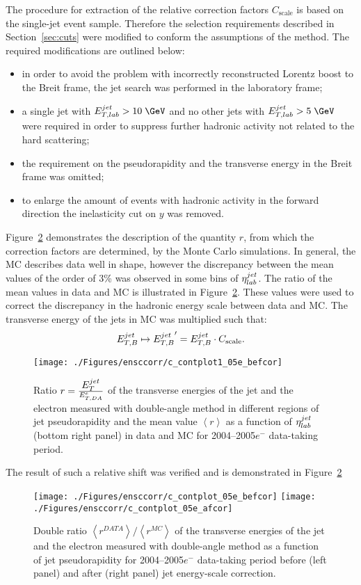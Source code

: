 The procedure for extraction of the relative correction factors $C_\text{scale}$ is based on the single-jet event sample. Therefore the selection requirements described in Section~\ref{sec:cuts} were modified to conform the assumptions of the method. The required modifications are outlined below: 
\begin{itemize}
	\item in order to avoid the problem with incorrectly reconstructed Lorentz boost to the Breit frame, the jet search was performed in the laboratory frame;
	\item a single jet with $\etjetlab > 10\; \GeV$ and no other jets with $\etjetlab > 5\; \GeV$ were required in order to suppress further hadronic activity not related to the hard scattering;
	\item the requirement on the pseudorapidity and the transverse energy in the Breit frame was omitted;
	\item to enlarge the amount of events with hadronic activity in the forward direction the inelasticity cut on $y$ was removed.
\end{itemize}

Figure~\ref{fig:ratcalibcontrolplot} demonstrates the description of the quantity $r$, from which the correction factors are determined, by the Monte Carlo simulations. In general, the MC describes data well in shape, however the discrepancy between the mean values of the order of 3\% was observed in some bins of $\mbox{$\eta^{jet}_{lab}$}$. The ratio of the mean values in data and MC is illustrated in Figure~\ref*{fig:ratcalibcontrolplot}. These values were used to correct the discrepancy in the hadronic energy scale between data and MC. The transverse energy of the jets in MC was multiplied such that:
\begin{equation}
 \mbox{$E_{T,B}^{jet}$} \mapsto \mbox{$E_{T,B}^{jet}$}' = \mbox{$E_{T,B}^{jet}$} \cdot C_\text{scale}.
\end{equation}
\begin{figure}[htbp]
	\centering
		\texttt{[image: ./Figures/ensccorr/c\_contplot1\_05e\_befcor]} 
	\caption{Ratio $r=\frac{\mbox{$E_T^{jet}$}}{E_{T,DA}^e}$ of the transverse energies of the jet and the electron measured with double-angle method in different regions of jet pseudorapidity and the mean value $\left\langle r\right\rangle$ as a function of $\mbox{$\eta^{jet}_{lab}$}$ (bottom right panel) in data and MC for 2004--2005$e^-$ data-taking period.}
	\label{fig:ratcalibcontrolplot}
\end{figure}
The result of such a relative shift was verified and is demonstrated in Figure~\ref*{fig:ratcalibcontrolplot}
\begin{figure}[htbp]
	\centering
		\texttt{[image: ./Figures/ensccorr/c\_contplot\_05e\_befcor]} 
		\texttt{[image: ./Figures/ensccorr/c\_contplot\_05e\_afcor]} 
	\caption{Double ratio $\left\langle r^{DATA}\right\rangle/\left\langle r^{MC}\right\rangle$ of the transverse energies of the jet and the electron measured with double-angle method as a function of jet pseudorapidity for 2004--2005$e^-$ data-taking period before (left panel) and after (right panel) jet energy-scale correction.}
	\label{fig:ratcalibcontrolplot}
\end{figure}

